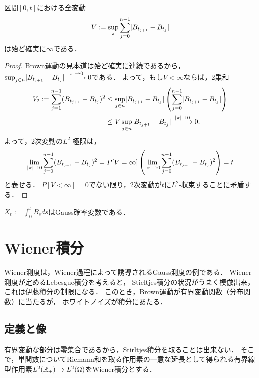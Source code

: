 \documentclass[uplatex,dvipdfmx]{jsreport}
\begin{document}
\begin{corollary}[全変動]
    区間$[0,t]$における全変動
    \[V:=\sup_{\pi}\sum^{n-1}_{j=0}\lvert B_{t_{j+1}}-B_{t_j}\rvert\]
    は殆ど確実に$\infty$である．
\end{corollary}
\begin{proof}
    Brown運動の見本道は殆ど確実に連続であるから，$\sup_{j\in n}\lvert B_{t_{j+1}}-B_{t_j}\rvert\xrightarrow{\lvert\pi\rvert\to0}0$である．
    よって，もし$V<\infty$ならば，2乗和
    \begin{align*}
        V_2:=\sum^{n-1}_{j=1}(B_{t_{j+1}}-B_{t_j})^2&\le\sup_{j\in n}\lvert B_{t_{j+1}}-B_{t_j}\rvert\left(\sum^{n-1}_{j=0}\lvert B_{t_{j+1}}-B_{t_j}\rvert\right)\\
        &\le V\sup_{j\in n}\lvert B_{t_{j+1}}-B_{t_j}\rvert\xrightarrow{\lvert\pi\rvert\to0}0.
    \end{align*}
    よって，2次変動の$L^2$-極限は，
    \[\lim_{\lvert\pi\rvert\to0}\sum^{n-1}_{j=0}(B_{t_{j+1}}-B_{t_j})^2=P[V=\infty]\left(\lim_{\lvert\pi\rvert\to0}\sum^{n-1}_{j=0}(B_{t_{j+1}}-B_{t_j})^2\right)=t\]
    と表せる．
    $P[V<\infty]=0$でない限り，2次変動が$t$に$L^2$-収束することに矛盾する．
\end{proof}

\begin{proposition}
    $X_t:=\int^t_0B_sds$はGauss確率変数である．
\end{proposition}



\section{Wiener積分}

\begin{tcolorbox}[colframe=ForestGreen, colback=ForestGreen!10!white,breakable,colbacktitle=ForestGreen!40!white,coltitle=black,fonttitle=\bfseries\sffamily,
    title=]
    Wiener測度は，Wiener過程によって誘導されるGauss測度の例である．
    Wiener測度が定めるLebesgue積分を考えると，
    Stieltjes積分の状況がうまく模倣出来，これは伊藤積分の制限になる．
    このとき，Brown運動が有界変動関数（分布関数）に当たるが，
    ホワイトノイズが積分にあたる．
\end{tcolorbox}

\subsection{定義と像}

\begin{tcolorbox}[colframe=ForestGreen, colback=ForestGreen!10!white,breakable,colbacktitle=ForestGreen!40!white,coltitle=black,fonttitle=\bfseries\sffamily,
title=]
    有界変動な部分は零集合であるから，Stirltjes積分を取ることは出来ない．
    そこで，単関数についてRiemann和を取る作用素の一意な延長として得られる有界線型作用素$L^2(\mathbb{R}_+)\to L^2(\Omega)$をWiener積分とする．
\end{tcolorbox}
\end{document}
